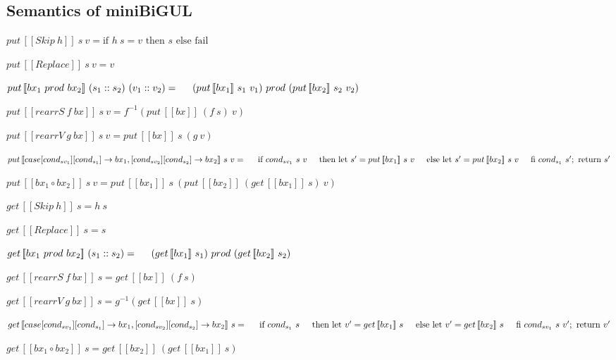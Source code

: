 \documentclass[runningheads]{llncs}
\newcommand{\tab}{\hspace*{5mm}}
\newcommand{\sif}[3]{\text{if } #1 \text{ then } #2 \text{ else } #3}
\newcommand{\product}[2]{#1 \ prod \ #2}
\newcommand{\tuple}[2]{(#1 :: #2)}
\newcommand{\rearrS}[2]{rearrS \ #1 \ #2}
\newcommand{\rearrV}[2]{rearrV \ #1 \ #2}
\newcommand{\casebx}[6]{case [#1][#2] \to #3, [#4][#5] \to #6}
\newcommand{\putbx}[3]{put \, [\![#1]\!] \ #2 \ #3}
\newcommand{\getbx}[2]{get \, [\![#1]\!] \ #2}
\begin{document}
\subsection{Semantics of miniBiGUL}

$\putbx{Skip \ h}{s}{v} = \sif{h \ s = v}{s}{\text{fail}}$

$\putbx{Replace}{s}{v} = v$

$\putbx{\product{bx_1}{bx_2}}{\tuple{s_1}{s_2}}{\tuple{v_1}{v_2}} =\\
    \tab \product{(\putbx{bx_1}{s_1}{v_1})}{(\putbx{bx_2}{s_2}{v_2})}$

$\putbx{\rearrS{f}{bx}}{s}{v} = f^{-1}(\putbx{bx}{(f \ s)}{v})$

$\putbx{\rearrV{g}{bx}}{s}{v} = \putbx{bx}{s}{(g \ v)}$

$\putbx{\casebx{cond_{sv_1}}{cond_{s_1}}{bx_1}{cond_{sv_2}}{cond_{s_2}}{bx_2}}{s}{v} = \\
    \tab \text{if } {cond_{sv_1} \ s \ v} \\
    \tab \text{then let } s' = \putbx{bx_1}{s}{v} \\
    \tab \text{else let } s' = \putbx{bx_2}{s}{v} \\
    \tab \text{fi } cond_{s_1} \ s'; \ \text{return} \ s'$

$\putbx{bx_1 \circ bx_2}{s}{v} = \putbx{bx_1}{s}{(\putbx{bx_2}{(\getbx{bx_1}{s})}{v})}$

\vspace{5mm}

$\getbx{Skip \ h}{s} = h \ s$

$\getbx{Replace}{s} = s$

$\getbx{\product{bx_1}{bx_2}}{\tuple{s_1}{s_2}} = \\
    \tab \product{(\getbx{bx_1}{s_1})}{(\getbx{bx_2}{s_2})}$

$\getbx{\rearrS{f}{bx}}{s} = \getbx{bx}{(f \ s)}$

$\getbx{\rearrV{g}{bx}}{s} = g^{-1} (\getbx{bx}{s})$

$\getbx{\casebx{cond_{sv_1}}{cond_{s_1}}{bx_1}{cond_{sv_2}}{cond_{s_2}}{bx_2}}{s} =\\
    \tab \text{if} \ {cond_{s_1} \ s}\\
    \tab \text{then let} \ v' = \getbx{bx_1}{s}\\
    \tab \text{else let} \ v' = \getbx{bx_2}{s}\\
    \tab \text{fi} \ {cond_{sv_1} \ s \ v'}; \ \text{return} \ v'$

$\getbx{bx_1 \circ bx_2}{s} = \getbx{bx_2}{(\getbx{bx_1}{s})}$
\end{document}
